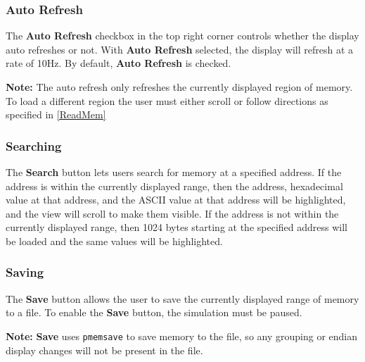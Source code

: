 \documentclass{article}
\newcommand{\code}[1]{\texttt{#1}}
\begin{document}
\subsubsection{Auto Refresh}
The \textbf{Auto Refresh} checkbox in the top right corner controls whether the display auto refreshes or not. With \textbf{Auto Refresh} selected, the display will refresh at a rate of 10Hz. By default, \textbf{Auto Refresh} is checked.\par
\textbf{Note:} The auto refresh only refreshes the currently displayed region of memory. To load a different region the user must either scroll or follow directions as specified in \ref{ReadMem}

\subsubsection{Searching}
The \textbf{Search} button lets users search for memory at a specified address. If the address is within the currently displayed range, then the address, hexadecimal value at that address, and the ASCII value at that address will be highlighted, and the view will scroll to make them visible. If the address is not within the currently displayed range, then 1024 bytes starting at the specified address will be loaded and the same values will be highlighted.

\subsubsection{Saving}
The \textbf{Save} button allows the user to save the currently displayed range of memory to a file. To enable the \textbf{Save} button, the simulation must be paused.\par
\textbf{Note:} \textbf{Save} uses \code{pmemsave} to save memory to the file, so any grouping or endian display changes will not be present in the file.
\end{document}
